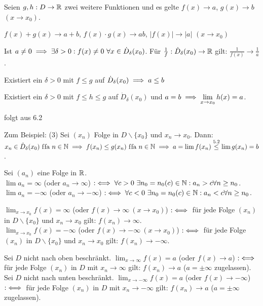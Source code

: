 \documentclass[a4paper,twoside,DIV15,BCOR12mm]{scrbook}
\begin{document}
\begin{satz}
Seien $g, h: D \to \mathbb{R}$ zwei weitere Funktionen und es gelte $f(x) \to a$, $g(x)\to b$ $(x\to x_0)$.
\begin{liste}
\item $f(x)+g(x) \to a+b$, $f(x)\cdot g(x) \to ab$, $|f(x)| \to |a|$ $(x\to x_0)$
\item Ist $a \ne 0 \implies \exists \delta>0: f(x)\ne 0 \ \forall x\in\dot D_\delta(x_0)$. Für $\frac{1}{f}: \dot D_\delta(x_0) \to \mathbb{R}$ gilt: $\frac{1}{f(x)} \to \frac{1}{a}$.
\item Existiert ein $\delta > 0 $ mit $f \le g$ auf $\dot D_\delta(x_0) \implies a \le b$
\item Existiert ein $\delta > 0$ mit $f \le h \le g$ auf $\dot D_\delta(x_0)$ und $a = b \implies \displaystyle\lim_{x\to x_0} h(x) = a$.
\end{liste}
\end{satz}

\begin{beweis}
folgt aus 6.2

Zum Beispiel: (3) Sei $(x_n)$ Folge in $D\backslash\{x_0\}$ und $x_n \to x_0$. Dann: $x_n \in \dot D_\delta(x_0) \text{ f\/fa } n\in\mathbb{N} \implies f(x_n) \le g(x_n) \text{ f\/fa } n\in\mathbb{N} \implies a = \lim f(x_n) \stackrel{\text{5.2}}{\le} \lim g(x_n) = b$.
\end{beweis}

\begin{definition}
\begin{liste}
\item Sei $(a_n)$ eine Folge in $\mathbb{R}$.\\
$\lim a_n = \infty$ (oder $a_n \to \infty$) $:\iff \forall c>0 \ \exists n_0 = n_0(c)\in\mathbb{N}: a_n > c \forall n\ge n_0$.\\ 
$\lim a_n = -\infty$ (oder $a_n \to -\infty$) $:\iff \forall c<0 \ \exists n_0 = n_0(c)\in\mathbb{N}: a_n < c \forall n\ge n_0$. 
\item $\displaystyle\lim_{x\to x_0} f(x) = \infty$ (oder $f(x) \to \infty\ (x\to x_0)$) $:\iff$ für jede Folge $(x_n)$ in $D\backslash\{x_0\}$  und $x_n \to x_0$ gilt: $f(x_n) \to \infty$. \\
$\displaystyle\lim_{x\to x_0} f(x) = -\infty$ (oder $f(x) \to -\infty\ (x\to x_0)$) $:\iff$ für jede Folge $(x_n)$ in $D\backslash\{x_0\}$  und $x_n \to x_0$ gilt: $f(x_n) \to -\infty$.
\item Sei $D$ nicht nach oben beschränkt. $\displaystyle\lim_{x\to \infty} f(x) = a$ (oder $f(x) \to a$) $:\iff$ für jede Folge $(x_n)$ in $D$ mit $x_n\to \infty$ gilt: $f(x_n) \to a$ ($a = \pm\infty$ zugelassen). \\
Sei $D$ nicht nach unten beschränkt. $\displaystyle\lim_{x\to -\infty} f(x) = a$ (oder $f(x) \to -\infty$) $:\iff$ für jede Folge $(x_n)$ in $D$ mit $x_n\to -\infty$ gilt: $f(x_n) \to a$ ($a = \pm\infty$ zugelassen). \\
\end{liste}
\end{definition}
\end{document}
